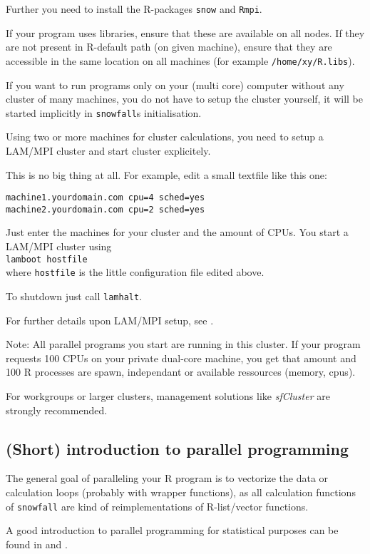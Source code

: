 \documentclass[10pt,oneside]{article}
\begin{document}
Further you need to install the R-packages \texttt{snow} and
\texttt{Rmpi}.

If your program uses libraries, ensure that these are available on all
nodes. If they are not present in R-default path (on given machine),
ensure that they are accessible in the same location on all machines
(for example \texttt{/home/xy/R.libs}).

If you want to run programs only on your (multi core) computer without
any cluster of many machines, you do not have to setup the cluster
yourself, it will be started implicitly in \texttt{snowfall}s initialisation.

Using two or more machines for cluster calculations, you need to setup
a LAM/MPI cluster and start cluster explicitely.

This is no big thing at all. For example, edit a small textfile like this
one:

\texttt{machine1.yourdomain.com cpu=4 sched=yes\\
machine2.yourdomain.com cpu=2 sched=yes}

Just enter the machines for your cluster and the amount of CPUs.
You start a LAM/MPI cluster using\\
\texttt{lamboot hostfile}\\
where \texttt{hostfile} is the little configuration file edited
above.

To shutdown just call \texttt{lamhalt}.

For further details upon LAM/MPI setup, see \cite{burns94:_lam}.

Note: All parallel programs you start are running in this cluster.
If your program requests 100 CPUs on your private dual-core machine,
you get that amount and 100 R processes are spawn, independant
or available ressources (memory, cpus).

For workgroups or larger clusters, management solutions like
\emph{sfCluster} are strongly recommended.

\subsection{(Short) introduction to parallel programming}
The general goal of paralleling your R program is to vectorize the data
or calculation loops (probably with wrapper functions), as all
calculation functions of \texttt{snowfall} are kind of reimplementations
of R-list/vector functions.

A good introduction to parallel programming for statistical
purposes can be found in \cite{ROSS_07} and \cite{HANA_STAT04}.
\end{document}
